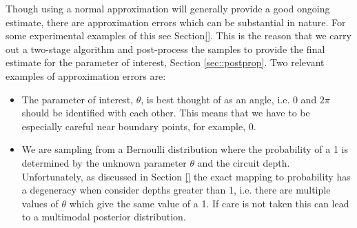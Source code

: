 Though using a normal approximation will generally provide a good ongoing estimate, there are approximation errors which can be substantial in nature. For some experimental examples of this see Section\ref{}. This is the reason that we carry out a two-stage algorithm and post-process the samples to provide the final estimate for the parameter of interest, Section \ref{sec::postprop}. Two relevant examples of approximation errors are:
\begin{itemize}
	\item The parameter of interest, $\theta$, is best thought of as an angle, i.e. $0$ and $2\pi$ should be identified with each other. This means that we have to be especially careful near boundary points, for example, 0.
	\item We are sampling from a Bernoulli distribution where the probability of a 1 is determined by the unknown parameter $\theta$ and the circuit depth. Unfortunately, as discussed in Section \ref{} the exact mapping to probability has a degeneracy when consider depths greater than 1, i.e. there are multiple values of $\theta$ which give the same value of a 1. If care is not taken this can lead to a multimodal posterior distribution.
\end{itemize}

